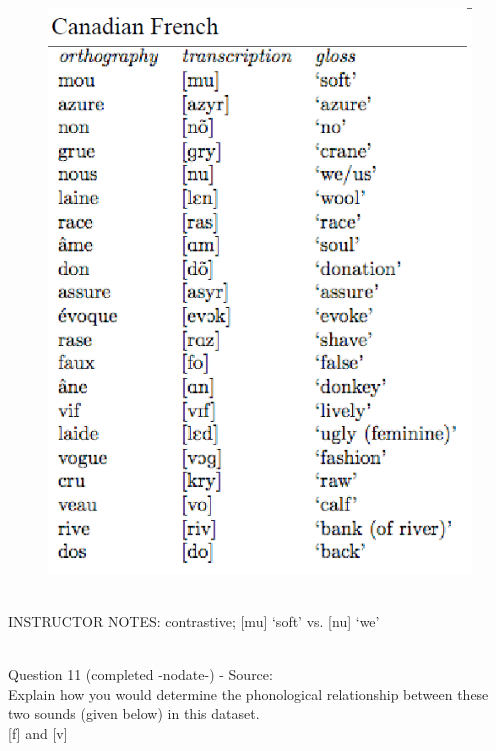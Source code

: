 \documentclass[12pt]{article}
\begin{document}
\begin{figure}[H]
\includegraphics{../images/canadianfrench.png}
\end{figure}

~\\
INSTRUCTOR NOTES: contrastive; [mu] ‘soft’ vs. [nu] ‘we’


~\\

{\large Question 11} (completed -nodate-) - Source: \\

Explain how you would determine the phonological relationship between these two sounds (given below) in this dataset.\\

{[f]} and {[v]}
\end{document}
